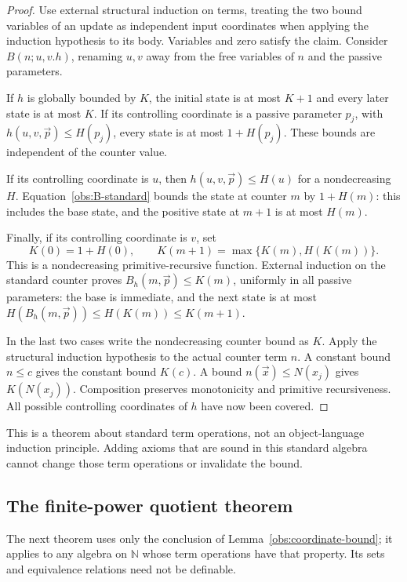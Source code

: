 \begin{proof}
Use external structural induction on terms, treating the two bound
variables of an update as independent input coordinates when applying
the induction hypothesis to its body. Variables and zero satisfy the
claim. Consider $B(n;u,v.h)$, renaming $u,v$ away from the free variables
of $n$ and the passive parameters.

If $h$ is globally bounded by $K$, the initial state is at most $K+1$
and every later state is at most $K$. If its controlling coordinate is a
passive parameter $p_j$, with $h(u,v,\vec p)\le H(p_j)$, every state is
at most $1+H(p_j)$. These bounds are independent of the counter value.

If its controlling coordinate is $u$, then $h(u,v,\vec p)\le H(u)$
for a nondecreasing $H$. Equation~\eqref{obs:B-standard} bounds the
state at counter $m$ by $1+H(m)$: this includes the base state, and the
positive state at $m+1$ is at most $H(m)$.

Finally, if its controlling coordinate is $v$, set
\[
 K(0)=1+H(0),\qquad
 K(m+1)=\max\{K(m),H(K(m))\}.
\]
This is a nondecreasing primitive-recursive function. External induction
on the standard counter proves $B_h(m,\vec p)\le K(m)$, uniformly in
all passive parameters: the base is immediate, and the next state is at
most $H(B_h(m,\vec p))\le H(K(m))\le K(m+1)$.

In the last two cases write the nondecreasing counter bound as $K$.
Apply the structural induction hypothesis to the actual counter term
$n$. A constant bound $n\le c$ gives the constant bound $K(c)$. A bound
$n(\vec x)\le N(x_j)$ gives $K(N(x_j))$. Composition preserves
monotonicity and primitive recursiveness. All possible controlling
coordinates of $h$ have now been covered.
\end{proof}

This is a theorem about standard term operations, not an object-language
induction principle. Adding axioms that are sound in this standard
algebra cannot change those term operations or invalidate the bound.

\subsection{The finite-power quotient theorem}

The next theorem uses only the conclusion of
Lemma~\ref{obs:coordinate-bound}; it applies to any algebra on
$\mathbb N$ whose term operations have that property. Its sets and
equivalence relations need not be definable.

